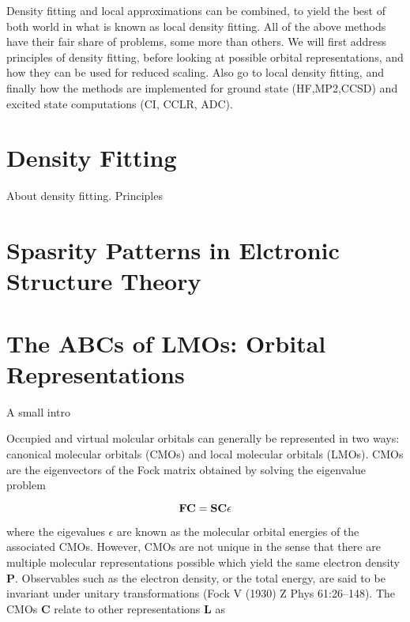 Density fitting and local approximations can be combined, to yield the best of both world in what is known as local density fitting.
All of the above methods have their fair share of problems, some more than others. We will first address principles of density fitting, before looking at possible orbital representations, and how they can be used for reduced scaling. Also go to local density fitting, and finally how the methods are implemented for ground state (HF,MP2,CCSD) and excited state computations (CI, CCLR, ADC).

\section{Density Fitting}
About density fitting. Principles

\section{Spasrity Patterns in Elctronic Structure Theory}


\section{The ABCs of LMOs: Orbital Representations}

A small intro


Occupied and virtual molcular orbitals can generally be represented in two ways: canonical molecular orbitals (CMOs) and local molecular orbitals (LMOs). CMOs are the eigenvectors of the Fock matrix obtained by solving the eigenvalue problem

\begin{equation}
\mathbf{F}\mathbf{C} = \mathbf{S}\mathbf{C} \epsilon
\end{equation}

where the eigevalues $\epsilon$ are known as the molecular orbital energies of the associated CMOs. However, CMOs are not unique in the sense that there are multiple molecular representations possible which yield the same electron density $\mathbf{P}$. Observables such as the electron density, or the total energy, are said to be invariant under unitary transformations (Fock V (1930) Z Phys 61:26–148). The CMOs $\mathbf{C}$ relate to other representations $\mathbf{L}$ as

